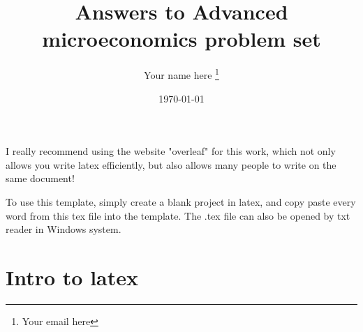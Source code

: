\documentclass[a4paper,11pt,american]{article}
\title{Answers to Advanced microeconomics problem set \EXERCISES}
\author{Your name here \thanks{Your email here}} %
\date{\today}
\begin{document}
\maketitle

I really recommend using the website "overleaf" for this work, which not only allows you write latex efficiently, but also allows many people to write on the same document! 

To use this template, simply create a blank project in latex, and copy paste every word from this tex file into the template. The .tex file can also be opened by txt reader in Windows system.
\section{Intro to latex}%
\end{document}
